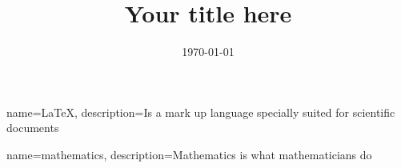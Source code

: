 \title{Your title here}
\def\metropoliadegree {Bachelor of Engineering} %
\def\metropoliadegreeprogramme {your degree programme (e.g. Information Technology)}
\def\metropoliaspecialisation {your major option (e.g. Mobile Solutions)}
\def\metropoliainstructors {
First name Last name, Title (for example: Project Manager)\newline
First name Last name, Title (for example: Principal Lecturer)
}
\def\metropoliakeywords {Keywords}
\date{\longmonth\today}





\makeglossaries


{
    name=\LaTeX{},
    description={Is a mark up language specially suited for scientific documents}
}
 
{
    name=mathematics,
    description={Mathematics is what mathematicians do}
}




